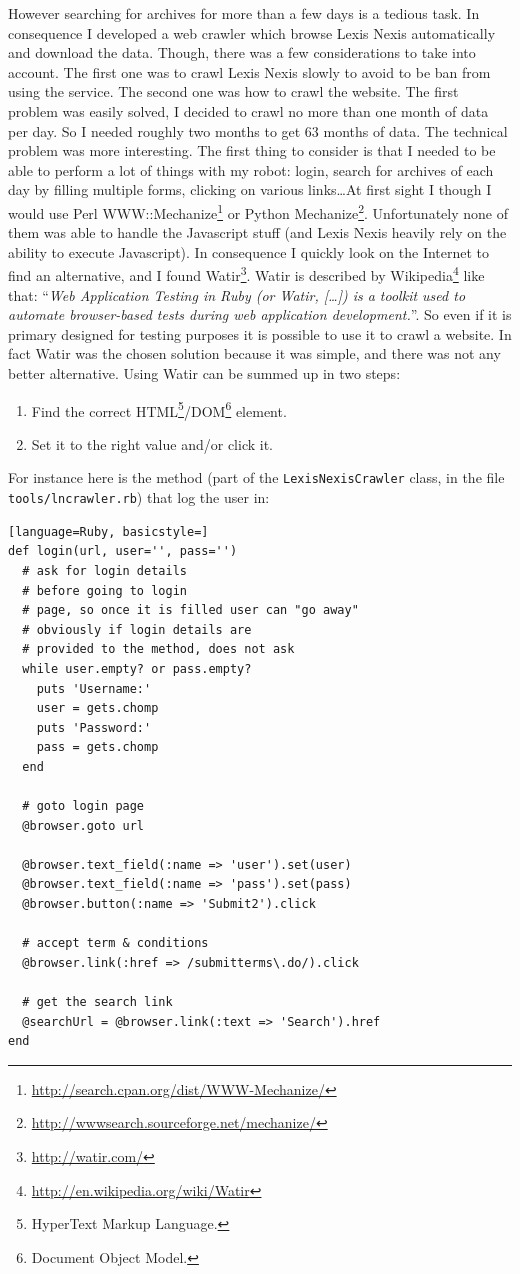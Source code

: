 \documentclass[12pt]{report}
\begin{document}
However searching for archives for more than a few days is a tedious task. In consequence I developed a web crawler which browse Lexis Nexis automatically and download the data. Though, there was a few considerations to take into account. The first one was to crawl Lexis Nexis slowly to avoid to be ban from using the service. The second one was how to crawl the website. The first problem was easily solved, I decided to crawl no more than one month of data per day. So I needed roughly two months to get 63 months of data. The technical problem was more interesting. The first thing to consider is that I needed to be able to perform a lot of things with my robot: login, search for archives of each day by filling multiple forms, clicking on various links\ldots At first sight I though I would use Perl WWW::Mechanize\footnote{\url{http://search.cpan.org/dist/WWW-Mechanize/}} or Python Mechanize\footnote{\url{http://wwwsearch.sourceforge.net/mechanize/}}. Unfortunately none of them was able to handle the Javascript stuff (and Lexis Nexis heavily rely on the ability to execute Javascript). In consequence I quickly look on the Internet to find an alternative, and I found Watir\footnote{\url{http://watir.com/}}. Watir is described by Wikipedia\footnote{\url{http://en.wikipedia.org/wiki/Watir}} like that: ``\emph{Web Application Testing in Ruby (or Watir, [\ldots]) is a toolkit used to automate browser-based tests during web application development.}''. So even if it is primary designed for testing purposes it is possible to use it to crawl a website. In fact Watir was the chosen solution because it was simple, and there was not any better alternative. Using Watir can be summed up in two steps:
\begin{enumerate}
	\item Find the correct HTML\footnote{HyperText Markup Language.}/DOM\footnote{Document Object Model.} element.
	\item Set it to the right value and/or click it.
\end{enumerate}

For instance here is the method (part of the \lstinline!LexisNexisCrawler! class, in the file \lstinline!tools/lncrawler.rb!) that log the user in:

\begin{lstlisting}[language=Ruby, basicstyle=]
def login(url, user='', pass='')
  # ask for login details
  # before going to login
  # page, so once it is filled user can "go away"
  # obviously if login details are
  # provided to the method, does not ask
  while user.empty? or pass.empty?
    puts 'Username:'
    user = gets.chomp
    puts 'Password:'
    pass = gets.chomp
  end

  # goto login page
  @browser.goto url

  @browser.text_field(:name => 'user').set(user)
  @browser.text_field(:name => 'pass').set(pass)
  @browser.button(:name => 'Submit2').click

  # accept term & conditions
  @browser.link(:href => /submitterms\.do/).click

  # get the search link
  @searchUrl = @browser.link(:text => 'Search').href
end
\end{lstlisting}
\end{document}
